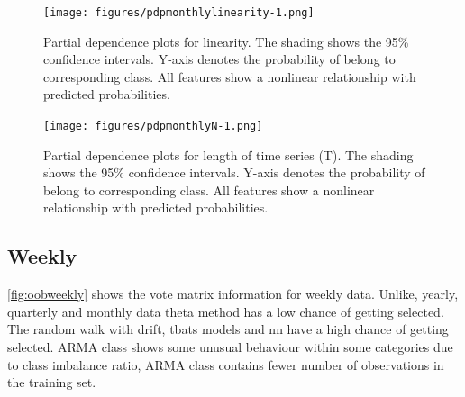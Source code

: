 \documentclass[11pt,a4paper,]{article}
\begin{document}
\begin{figure}
\centering
\texttt{[image: figures/pdpmonthlylinearity-1.png]}
\caption{\label{fig:pdpmonthlylinearity}Partial dependence plots for
linearity. The shading shows the 95\% confidence intervals. Y-axis
denotes the probability of belong to corresponding class. All features
show a nonlinear relationship with predicted probabilities.}
\end{figure}

\begin{figure}
\centering
\texttt{[image: figures/pdpmonthlyN-1.png]}
\caption{\label{fig:pdpmonthlyN}Partial dependence plots for length of time
series (T). The shading shows the 95\% confidence intervals. Y-axis
denotes the probability of belong to corresponding class. All features
show a nonlinear relationship with predicted probabilities.}
\end{figure}

\subsection{Weekly}\label{weekly}

\autoref{fig:oobweekly} shows the vote matrix information for weekly
data. Unlike, yearly, quarterly and monthly data theta method has a low
chance of getting selected. The random walk with drift, tbats models and
nn have a high chance of getting selected. ARMA class shows some unusual
behaviour within some categories due to class imbalance ratio, ARMA
class contains fewer number of observations in the training set.
\end{document}
